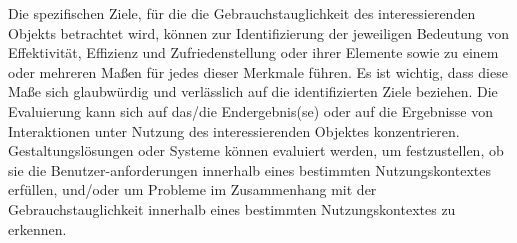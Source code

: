 Die spezifischen Ziele, für die die Gebrauchstauglichkeit des interessierenden Objekts betrachtet wird, können zur Identifizierung der jeweiligen Bedeutung von Effektivität, Effizienz und Zufriedenstellung oder ihrer Elemente sowie zu einem oder mehreren Maßen für jedes dieser Merkmale führen. Es ist wichtig, dass diese Maße sich glaubwürdig und verlässlich auf die identifizierten Ziele beziehen.\newline
Die Evaluierung kann sich auf das/die Endergebnis(se) oder auf die Ergebnisse von Interaktionen unter Nutzung des interessierenden Objektes konzentrieren.\newline
Gestaltungslösungen oder Systeme können evaluiert werden, um festzustellen, ob sie die Benutzer-anforderungen innerhalb eines bestimmten Nutzungskontextes erfüllen, und/oder um Probleme im Zusammenhang mit der Gebrauchstauglichkeit innerhalb eines bestimmten Nutzungskontextes zu erkennen.

